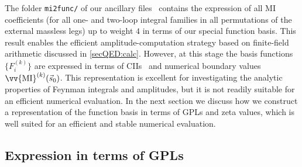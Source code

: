 \documentclass[main.tex]{subfiles}
\begin{document}
The folder \texttt{mi2func/} of our ancillary files~\cite{zenodo} contains the expression of all MI coefficients (for all one- and two-loop integral families in all permutations of the external massless legs) up to weight $4$ in terms of our special function basis. This result enables the efficient amplitude-computation strategy based on finite-field arithmetic discussed in \cref{secQED:calc}.
However, at this stage the basis functions $\{F^{(k)}_i\}$ are expressed in terms of CIIs~\cite{Chen:1977oja} and numerical boundary values $\vv{\text{MI}}^{(k)}(\vec{s}_0)$. This representation is excellent for investigating the analytic properties of Feynman integrals and amplitudes, but it is not readily suitable for an efficient numerical evaluation.
In the next section we discuss how we construct a representation of the function basis in terms of GPLs and zeta values, which is well suited for an efficient and stable numerical evaluation.


\subsection{Expression in terms of GPLs}
\label{secQED:basis_MPLs}
\end{document}
